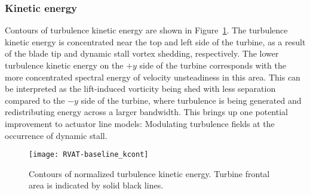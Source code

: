 \subsubsection{Kinetic energy}

Contours of turbulence kinetic energy are shown in
Figure~\ref{fig:RVAT-baseline-kcont}. The turbulence kinetic energy is
concentrated near the top and left side of the turbine, as a result of the blade
tip and dynamic stall vortex shedding, respectively. The lower turbulence
kinetic energy on the $+y$ side of the turbine corresponds with the more
concentrated spectral energy of velocity unsteadiness in this area. This can be
interpreted as the lift-induced vorticity being shed with less separation
compared to the $-y$ side of the turbine, where turbulence is being generated
and redistributing energy across a larger bandwidth. This brings up one
potential improvement to actuator line models: Modulating turbulence fields at
the occurrence of dynamic stall.

\begin{figure}
    \centering

    \texttt{[image: RVAT-baseline\_kcont]}

    \caption{Contours of normalized turbulence kinetic energy. Turbine frontal
        area is indicated by solid black lines.}

    \label{fig:RVAT-baseline-kcont}
\end{figure}

